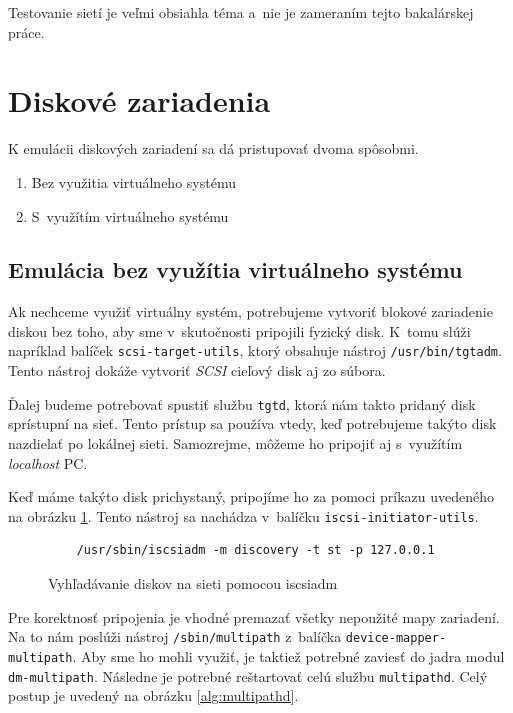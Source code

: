 Testovanie sietí je veľmi obsiahla téma a~nie je zameraním tejto bakalárskej
práce.

%
%

\section{Diskové zariadenia}

K emulácii diskových zariadení sa dá pristupovať dvoma spôsobmi. 

\begin{enumerate}
    \item Bez využitia virtuálneho systému \label{item:without-virt-system}
    \item S~využítím virtuálneho systému \label{item:with-virt-system}
\end{enumerate}

%
%

\subsection{Emulácia bez využítia virtuálneho systému}

Ak nechceme využiť virtuálny systém, potrebujeme vytvoriť blokové zariadenie
diskou bez toho, aby sme v~skutočnosti pripojili fyzický disk. K~tomu slúži
napríklad balíček \texttt{scsi-target-utils}, ktorý obsahuje nástroj
\texttt{/usr/bin/tgtadm}.  Tento nástroj dokáže vytvoriť \emph{SCSI} cieľový
disk aj zo súbora. 

Ďalej budeme potrebovať spustiť službu \texttt{tgtd}, ktorá nám takto pridaný
disk sprístupní na sieť. Tento prístup sa používa vtedy, keď potrebujeme takýto
disk nazdielať po lokálnej sieti. Samozrejme, môžeme ho pripojiť aj s~využítím
\emph{localhost} PC.

Keď máme takýto disk prichystaný, pripojíme ho za pomoci príkazu uvedeného na
obrázku \ref{alg:iscsiadm-discovery}. Tento nástroj sa nachádza v~balíčku
\texttt{iscsi-initiator-utils}.

\begin{figure}[H]
\begin{lstlisting}
    /usr/sbin/iscsiadm -m discovery -t st -p 127.0.0.1
\end{lstlisting}
\caption{Vyhľadávanie diskov na sieti pomocou iscsiadm}
\label{alg:iscsiadm-discovery}
\end{figure}

Pre korektnosť pripojenia je vhodné premazať všetky nepoužité mapy zariadení.
Na to nám poslúži nástroj \texttt{/sbin/multipath} z~balíčka
\texttt{device-mapper-multipath}. Aby sme ho mohli využiť, je taktiež potrebné
zaviesť do jadra modul \texttt{dm-multipath}. Následne je potrebné reštartovať celú
službu \texttt{multipathd}. Celý postup je uvedený na obrázku
\ref{alg:multipathd}.

